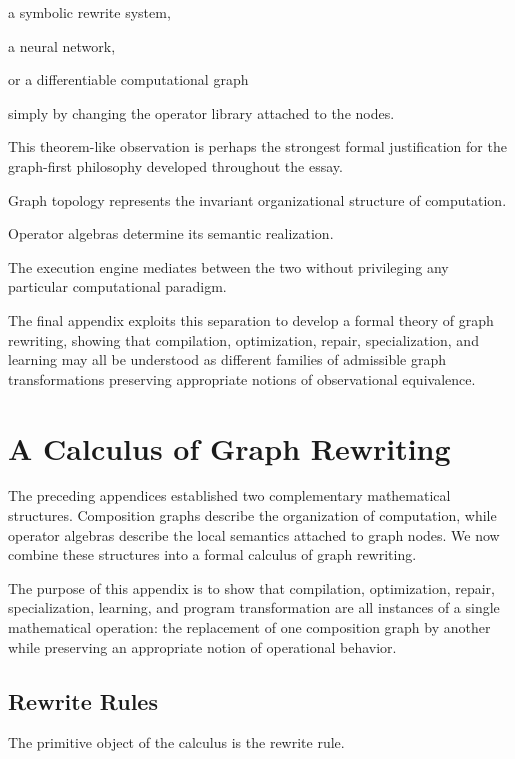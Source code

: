 \documentclass[12pt,oneside]{article}
\begin{document}
a symbolic rewrite system,

a neural network,

or a differentiable computational graph

simply by changing the operator library attached to the nodes.

This theorem-like observation is perhaps the strongest formal justification for the graph-first philosophy developed throughout the essay.

Graph topology represents the invariant organizational structure of computation.

Operator algebras determine its semantic realization.

The execution engine mediates between the two without privileging any particular computational paradigm.

The final appendix exploits this separation to develop a formal theory of graph rewriting, showing that compilation, optimization, repair, specialization, and learning may all be understood as different families of admissible graph transformations preserving appropriate notions of observational equivalence.

\section{A Calculus of Graph Rewriting}

The preceding appendices established two complementary mathematical structures. Composition graphs describe the organization of computation, while operator algebras describe the local semantics attached to graph nodes. We now combine these structures into a formal calculus of graph rewriting.

The purpose of this appendix is to show that compilation, optimization, repair, specialization, learning, and program transformation are all instances of a single mathematical operation: the replacement of one composition graph by another while preserving an appropriate notion of operational behavior.

\subsection{Rewrite Rules}

The primitive object of the calculus is the rewrite rule.
\end{document}
